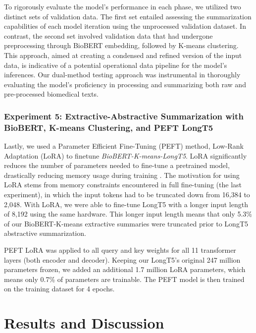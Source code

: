 \documentclass[11pt]{article}
\begin{document}
To rigorously evaluate the model's performance in each phase, we utilized two distinct sets of validation data. The first set entailed assessing the summarization capabilities of each model iteration using the unprocessed validation dataset. In contrast, the second set involved validation data that had undergone preprocessing through BioBERT embedding, followed by K-means clustering. This approach, aimed at creating a condensed and refined version of the input data, is indicative of a potential operational data pipeline for the model’s inferences. Our dual-method testing approach was instrumental in thoroughly evaluating the model’s proficiency in processing and summarizing both raw and pre-processed biomedical texts.

\subsubsection{Experiment 5: Extractive-Abstractive Summarization with BioBERT, K-means Clustering, and PEFT LongT5}

Lastly, we used a Parameter Efficient Fine-Tuning (PEFT) method, Low-Rank Adaptation (LoRA) to finetune \textit{BioBERT-K-means-LongT5}. LoRA significantly reduces the number of parameters needed to fine-tune a pretrained model, drastically reducing memory usage during training \cite{hu2021lora}. The motivation for using LoRA stems from memory constraints encountered in full fine-tuning (the last experiment), in which the input tokens had to be truncated down from 16,384 to 2,048. With LoRA, we were able to fine-tune LongT5 with a longer input length of 8,192 using the same hardware. This longer input length means that only 5.3\% of our BioBERT-K-means extractive summaries were truncated prior to LongT5 abstractive summarization.


PEFT LoRA was applied to all query and key weights for all 11 transformer layers (both encoder and decoder). Keeping our LongT5’s original 247 million parameters frozen, we added an additional 1.7 million LoRA parameters, which means only 0.7\% of parameters are trainable. The PEFT model is then trained on the training dataset for 4 epochs.

\section{Results and Discussion}
\end{document}
